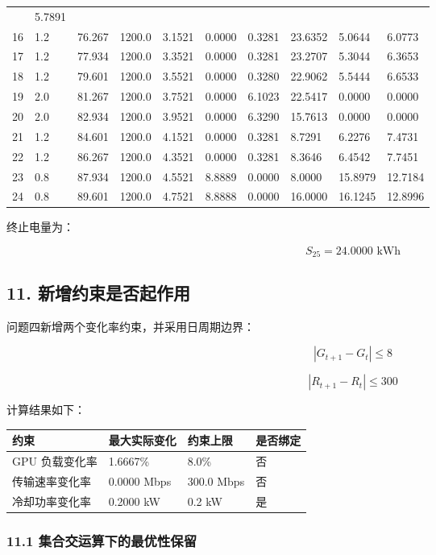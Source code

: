 \documentclass[
]{article}
\begin{document}
\begin{longtable}[]{@{}llllllllll@{}}
& 5.7891 \\
16 & 1.2 & 76.267 & 1200.0 & 3.1521 & 0.0000 & 0.3281 & 23.6352 & 5.0644
& 6.0773 \\
17 & 1.2 & 77.934 & 1200.0 & 3.3521 & 0.0000 & 0.3281 & 23.2707 & 5.3044
& 6.3653 \\
18 & 1.2 & 79.601 & 1200.0 & 3.5521 & 0.0000 & 0.3280 & 22.9062 & 5.5444
& 6.6533 \\
19 & 2.0 & 81.267 & 1200.0 & 3.7521 & 0.0000 & 6.1023 & 22.5417 & 0.0000
& 0.0000 \\
20 & 2.0 & 82.934 & 1200.0 & 3.9521 & 0.0000 & 6.3290 & 15.7613 & 0.0000
& 0.0000 \\
21 & 1.2 & 84.601 & 1200.0 & 4.1521 & 0.0000 & 0.3281 & 8.7291 & 6.2276
& 7.4731 \\
22 & 1.2 & 86.267 & 1200.0 & 4.3521 & 0.0000 & 0.3281 & 8.3646 & 6.4542
& 7.7451 \\
23 & 0.8 & 87.934 & 1200.0 & 4.5521 & 8.8889 & 0.0000 & 8.0000 & 15.8979
& 12.7184 \\
24 & 0.8 & 89.601 & 1200.0 & 4.7521 & 8.8888 & 0.0000 & 16.0000 &
16.1245 & 12.8996 \\
\end{longtable}

终止电量为：

\[S_{25}=24.0000\text{ kWh}\]

\subsection{11.
新增约束是否起作用}\label{11-ux65b0ux589eux7ea6ux675fux662fux5426ux8d77ux4f5cux7528}

问题四新增两个变化率约束，并采用日周期边界：

\[|G_{t+1}-G_t|\le 8\]

\[|R_{t+1}-R_t|\le 300\]

计算结果如下：

\begin{longtable}[]{@{}llll@{}}
\toprule\noalign{}
约束 & 最大实际变化 & 约束上限 & 是否绑定 \\
\midrule\noalign{}
\endhead
\bottomrule\noalign{}
\endlastfoot
GPU 负载变化率 & 1.6667\% & 8.0\% & 否 \\
传输速率变化率 & 0.0000 Mbps & 300.0 Mbps & 否 \\
冷却功率变化率 & 0.2000 kW & 0.2 kW & 是 \\
\end{longtable}

\subsubsection{11.1
集合交运算下的最优性保留}\label{111-ux96c6ux5408ux4ea4ux8fd0ux7b97ux4e0bux7684ux6700ux4f18ux6027ux4fddux7559}
\end{document}
